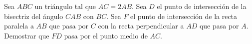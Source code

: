 Sea $ABC$ un triángulo tal que $AC=2AB$. Sea $D$ el punto de intersección de la bisectriz del ángulo $CAB$ con $BC$. Sea $F$ el punto de intersección de la recta paralela a $AB$ que pasa por $C$ con la recta perpendicular a $AD$ que pasa por $A$. Demostrar que $FD$ pasa por el punto medio de $AC$.
